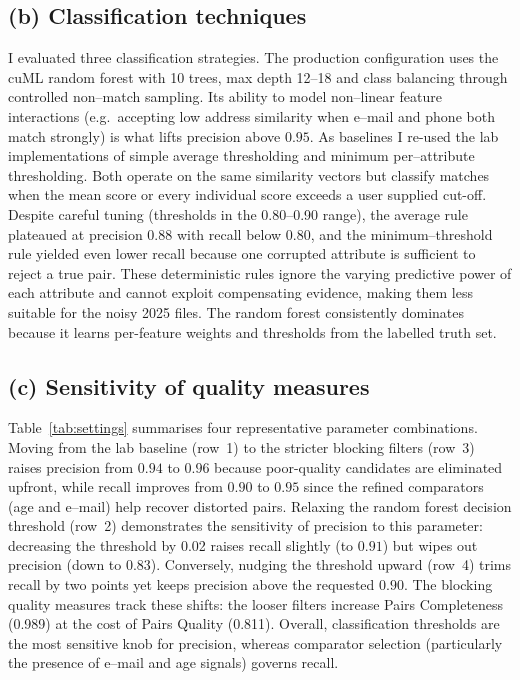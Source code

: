 \documentclass[11pt]{article}
\begin{document}
\subsection*{(b) Classification techniques}
I evaluated three classification strategies. The production configuration uses the cuML random forest with 10 trees, max depth 12--18 and class balancing through controlled non--match sampling. Its ability to model non--linear feature interactions (e.g.\ accepting low address similarity when e--mail and phone both match strongly) is what lifts precision above $0.95$. As baselines I re-used the lab implementations of simple average thresholding and minimum per--attribute thresholding. Both operate on the same similarity vectors but classify matches when the mean score or every individual score exceeds a user supplied cut-off. Despite careful tuning (thresholds in the 0.80--0.90 range), the average rule plateaued at precision $0.88$ with recall below $0.80$, and the minimum--threshold rule yielded even lower recall because one corrupted attribute is sufficient to reject a true pair. These deterministic rules ignore the varying predictive power of each attribute and cannot exploit compensating evidence, making them less suitable for the noisy 2025 files. The random forest consistently dominates because it learns per-feature weights and thresholds from the labelled truth set.

\subsection*{(c) Sensitivity of quality measures}
Table~\ref{tab:settings} summarises four representative parameter combinations. Moving from the lab baseline (row~1) to the stricter blocking filters (row~3) raises precision from $0.94$ to $0.96$ because poor-quality candidates are eliminated upfront, while recall improves from $0.90$ to $0.95$ since the refined comparators (age and e--mail) help recover distorted pairs. Relaxing the random forest decision threshold (row~2) demonstrates the sensitivity of precision to this parameter: decreasing the threshold by 0.02 raises recall slightly (to $0.91$) but wipes out precision (down to $0.83$). Conversely, nudging the threshold upward (row~4) trims recall by two points yet keeps precision above the requested $0.90$. The blocking quality measures track these shifts: the looser filters increase Pairs Completeness (0.989) at the cost of Pairs Quality (0.811). Overall, classification thresholds are the most sensitive knob for precision, whereas comparator selection (particularly the presence of e--mail and age signals) governs recall.
\end{document}
